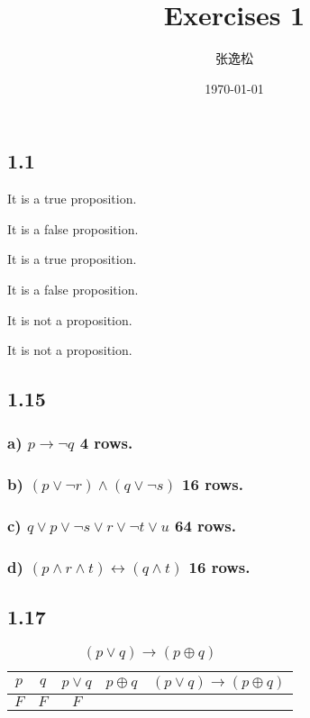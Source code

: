 \documentclass[10pt]{ctexart}
\title{Exercises 1}
\author{张逸松}
\date{\today}
\begin{document}
    \maketitle
    \subsection*{1.1}
        It is a true proposition.\par
        It is a false proposition.\par
        It is a true proposition.\par
        It is a false proposition.\par
        It is not a proposition.\par
        It is not a proposition. 

    \subsection*{1.15}
        \subsubsection*{a) $p \rightarrow \neg q$ 4 rows.}
        \subsubsection*{b) $(p \vee \neg r) \wedge (q \vee \neg s)$ 16 rows.}
        \subsubsection*{c) $q \vee p \vee \neg s \vee r \vee \neg t \vee u$ 64 rows.}
        \subsubsection*{d) $(p \wedge r \wedge t) \leftrightarrow (q \wedge t)$ 16 rows.}
    \subsection*{1.17}
        \begin{table}[h]
            \centering
            \renewcommand{\thesubtable}{\alph{subtable}}
            \begin{subtable}[h]{2in}
                \centering
                \caption{$(p \vee q) \rightarrow (p \oplus q)$}
                \begin{tabular}{|c|c|c|c|c|}
                    \hline
                    $p$ & $q$ & $p \vee q$ & $p \oplus q$ & $(p \vee q) \rightarrow (p \oplus q)$ \\
                    \hline
                    $F$ & $F$ & $F$ & 
                    \hline
                \end{tabular}
            \end{subtable}
        \end{table}
    \newpage
\end{document}
